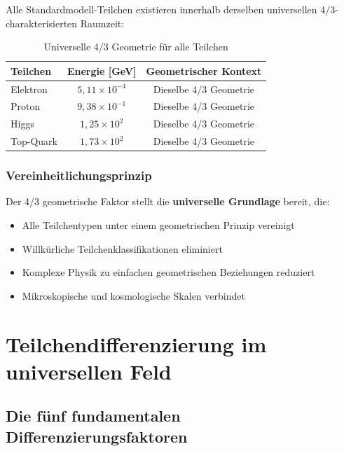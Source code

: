 	Alle Standardmodell-Teilchen existieren innerhalb derselben universellen 4/3-charakterisierten Raumzeit:
	
	\begin{table}[htbp]
		\centering
		\begin{tabular}{lcc}
			\toprule
			\textbf{Teilchen} & \textbf{Energie [GeV]} & \textbf{Geometrischer Kontext} \\
			\midrule
			Elektron & $5{,}11 \times 10^{-4}$ & Dieselbe 4/3 Geometrie \\
			Proton & $9{,}38 \times 10^{-1}$ & Dieselbe 4/3 Geometrie \\
			Higgs & $1{,}25 \times 10^{2}$ & Dieselbe 4/3 Geometrie \\
			Top-Quark & $1{,}73 \times 10^{2}$ & Dieselbe 4/3 Geometrie \\
			\bottomrule
		\end{tabular}
		\caption{Universelle 4/3 Geometrie für alle Teilchen}
		\label{tab:universelle_geometrie}
	\end{table}
	
	\subsubsection{Vereinheitlichungsprinzip}
	\label{subsubsec:vereinheitlichungsprinzip}
	
	Der 4/3 geometrische Faktor stellt die \textbf{universelle Grundlage} bereit, die:
	\begin{itemize}
		\item Alle Teilchentypen unter einem geometrischen Prinzip vereinigt
		\item Willkürliche Teilchenklassifikationen eliminiert
		\item Komplexe Physik zu einfachen geometrischen Beziehungen reduziert
		\item Mikroskopische und kosmologische Skalen verbindet
	\end{itemize}
	
	\section{Teilchendifferenzierung im universellen Feld}
	\label{sec:teilchendifferenzierung}
	
	\subsection{Die fünf fundamentalen Differenzierungsfaktoren}
	\label{subsec:fuenf_faktoren}
	
